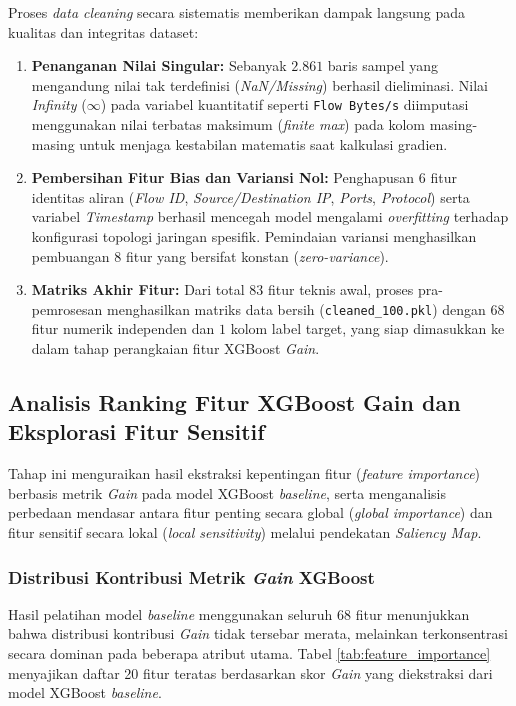 \documentclass[11pt, a4paper]{article}
\begin{document}
Proses \textit{data cleaning} secara sistematis memberikan dampak langsung pada kualitas dan integritas dataset:
\begin{enumerate}
    \item \textbf{Penanganan Nilai Singular:} Sebanyak $2.861$ baris sampel yang mengandung nilai tak terdefinisi (\textit{NaN/Missing}) berhasil dieliminasi. Nilai \textit{Infinity} ($\infty$) pada variabel kuantitatif seperti \texttt{Flow Bytes/s} diimputasi menggunakan nilai terbatas maksimum (\textit{finite max}) pada kolom masing-masing untuk menjaga kestabilan matematis saat kalkulasi gradien.
    \item \textbf{Pembersihan Fitur Bias dan Variansi Nol:} Penghapusan $6$ fitur identitas aliran (\textit{Flow ID}, \textit{Source/Destination IP}, \textit{Ports}, \textit{Protocol}) serta variabel \textit{Timestamp} berhasil mencegah model mengalami \textit{overfitting} terhadap konfigurasi topologi jaringan spesifik. Pemindaian variansi menghasilkan pembuangan $8$ fitur yang bersifat konstan (\textit{zero-variance}).
    \item \textbf{Matriks Akhir Fitur:} Dari total $83$ fitur teknis awal, proses pra-pemrosesan menghasilkan matriks data bersih (\texttt{cleaned\_100.pkl}) dengan $68$ fitur numerik independen dan $1$ kolom label target, yang siap dimasukkan ke dalam tahap perangkaian fitur XGBoost \textit{Gain}.
\end{enumerate}


\subsection{Analisis Ranking Fitur XGBoost Gain dan Eksplorasi Fitur Sensitif}
Tahap ini menguraikan hasil ekstraksi kepentingan fitur (\textit{feature importance}) berbasis metrik \textit{Gain} pada model XGBoost \textit{baseline}, serta menganalisis perbedaan mendasar antara fitur penting secara global (\textit{global importance}) dan fitur sensitif secara lokal (\textit{local sensitivity}) melalui pendekatan \textit{Saliency Map}.

\subsubsection{Distribusi Kontribusi Metrik \textit{Gain} XGBoost}
Hasil pelatihan model \textit{baseline} menggunakan seluruh $68$ fitur menunjukkan bahwa distribusi kontribusi \textit{Gain} tidak tersebar merata, melainkan terkonsentrasi secara dominan pada beberapa atribut utama. Tabel \ref{tab:feature_importance} menyajikan daftar 20 fitur teratas berdasarkan skor \textit{Gain} yang diekstraksi dari model XGBoost \textit{baseline}.
\end{document}

